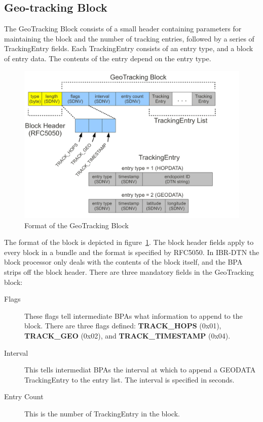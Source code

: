 \subsection{Geo-tracking Block}

The GeoTracking Block consists of a small header containing parameters for maintaining the block and the number of tracking entries, followed by a series of TrackingEntry fields.  Each TrackingEntry consists of an entry type, and a block of entry data.  The contents of the entry depend on the entry type.

\begin{figure}
\begin{center}
\includegraphics[width=\columnwidth]{figures/tracking-block.pdf}
\end{center}
\caption{Format of the GeoTracking Block}
\label{fig:tracking-block}
\end{figure}

The format of the block is depicted in figure~\ref{fig:tracking-block}.  The block header fields apply to every block in a bundle and the format is specified by RFC5050.  In IBR-DTN the block processor only deals with the contents of the block itself, and the BPA strips off the block header.  There are three mandatory fields in the GeoTracking block:
\begin{description}
  \item[Flags] These flags tell intermediate BPAs what information to append to the block.  There are three flags defined: {\bf TRACK\_HOPS} (0x01), {\bf TRACK\_GEO} (0x02), and {\bf TRACK\_TIMESTAMP} (0x04).
  \item[Interval] This tells intermediat BPAs the interval at which to append a GEODATA TrackingEntry to the entry list.  The interval is specified in seconds.
  \item[Entry Count] This is the number of TrackingEntry in the block.
\end{description}

